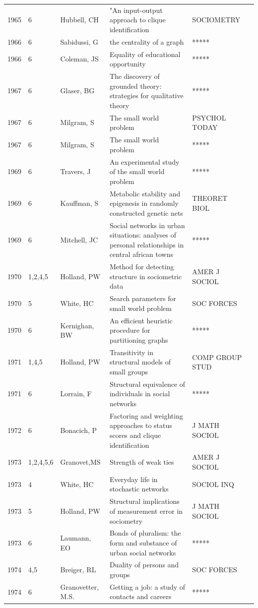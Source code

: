 \documentclass[11pt]{article} %
\begin{document}
\begin{longtable}{p{0.8cm}|p{1.25cm}|p{2.8cm}|p{7.5cm}|p{3cm}l}
1965&	6&	Hubbell, CH &	"An input-output approach to clique
identification& SOCIOMETRY\\
1966&	6&	Sabidussi, G&	 the centrality of a graph&	*****\\
1966&	6&	Coleman, JS&	 Equality of educational opportunity&	*****\\
1967&	6&	Glaser, BG&	 The discovery of grounded theory: strategies for qualitative theory&	*****\\
1967&	6&	Milgram, S&	The small world problem&	PSYCHOL TODAY\\
1967&	6&	Milgram, S&	 The small world problem&	*****\\
1969&	6&	Travers, J&	 An experimental study of the small world problem&	*****\\
1969&	6&	Kauffman, S&	 Metabolic stability and epigenesis in randomly constructed genetic nets&	THEORET BIOL \\
1969&	6&	Mitchell, JC&	 Social networks in urban situations: analyses of personal relationships in central african towns&	*****\\
1970&	1,2,4,5&	Holland, PW&	 Method for detecting structure in sociometric data&	AMER J SOCIOL\\
1970&	5&	White, HC&	 Search parameters for small world problem&	SOC FORCES\\
1970&	6&	Kernighan, BW&	 An efficient heuristic procedure for partitioning graphs&	*****\\
1971&	1,4,5&	Holland, PW&	 Transitivity in structural models of small groups&	COMP GROUP STUD\\
1971&	6&	Lorrain, F  &	 Structural equivalence of individuals in social networks&	*****\\
1972&	6&	Bonacich, P&	 Factoring and weighting approaches to status scores and clique identification&	J MATH SOCIOL\\
1973&	1,2,4,5,6&	Granovet,MS&	 Strength of weak ties&	AMER J SOCIOL\\
1973&	4&	White, HC&	 Everyday life in stochastic networks&	SOCIOL INQ\\
1973&	5&	Holland, PW&	 Structural implications of measurement error in sociometry&	J MATH SOCIOL\\
1973&	6&	Laumann, EO&	 Bonds of pluralism: the form and substance of urban social networks&	*****\\
1974&	4,5&	Breiger, RL&	 Duality of persons and groups&	SOC FORCES\\
1974&	6&	Granovetter, M.S.&	 Getting a job: a study of contacts and careers&	*****\\

\end{longtable}
\end{document}
